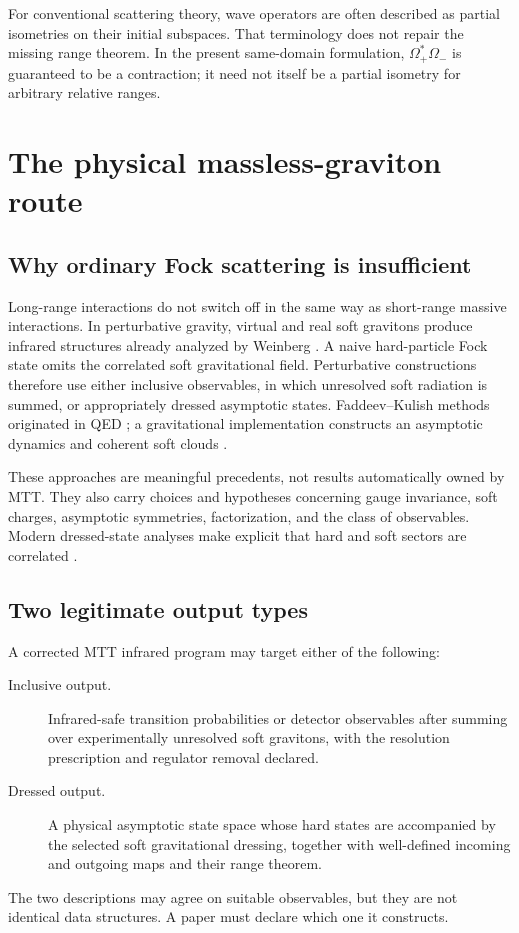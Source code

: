 \documentclass[11pt]{article}
\newcommand{\OmIn}{\Omega_{-}}
\newcommand{\OmOut}{\Omega_{+}}
\begin{document}
For conventional scattering theory, wave operators are often described as
partial isometries on their initial subspaces. That terminology does not
repair the missing range theorem. In the present same-domain formulation,
$\OmOut^*\OmIn$ is guaranteed to be a contraction; it need not itself be a
partial isometry for arbitrary relative ranges.

\section{The physical massless-graviton route}

\subsection{Why ordinary Fock scattering is insufficient}

Long-range interactions do not switch off in the same way as short-range
massive interactions. In perturbative gravity, virtual and real soft
gravitons produce infrared structures already analyzed by Weinberg
\cite{Weinberg1965}. A naive hard-particle Fock state omits the correlated
soft gravitational field. Perturbative constructions therefore use either
inclusive observables, in which unresolved soft radiation is summed, or
appropriately dressed asymptotic states. Faddeev--Kulish methods originated
in QED \cite{KulishFaddeev1970}; a gravitational implementation constructs an
asymptotic dynamics and coherent soft clouds \cite{WareSaotomeAkhoury2013}.

These approaches are meaningful precedents, not results automatically owned
by MTT. They also carry choices and hypotheses concerning gauge invariance,
soft charges, asymptotic symmetries, factorization, and the class of
observables. Modern dressed-state analyses make explicit that hard and soft
sectors are correlated \cite{ChoiAkhoury2019}.

\subsection{Two legitimate output types}

A corrected MTT infrared program may target either of the following:
\begin{description}
\item[Inclusive output.] Infrared-safe transition probabilities or detector
observables after summing over experimentally unresolved soft gravitons, with
the resolution prescription and regulator removal declared.
\item[Dressed output.] A physical asymptotic state space whose hard states are
accompanied by the selected soft gravitational dressing, together with
well-defined incoming and outgoing maps and their range theorem.
\end{description}
The two descriptions may agree on suitable observables, but they are not
identical data structures. A paper must declare which one it constructs.
\end{document}
